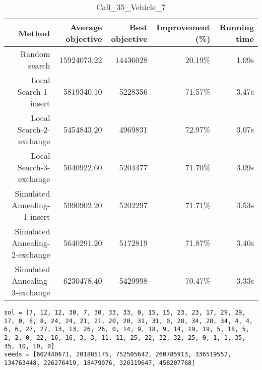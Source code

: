\begin{table}[ht]
\centering
\caption{Call\_35\_Vehicle\_7}
\label{tab:call35vehicle7}
\begin{tabular}{|r|r|r|r|r|}
Method & Average objective & Best objective & Improvement (\%) & Running time \\
\hline
Random search & 15924073.22 & 14436028 & 20.19\% & 1.09s\\
Local Search-1-insert & 5819340.10 & 5228356 & 71.57\% & 3.47s\\
Local Search-2-exchange & 5454843.20 & 4969831 & 72.97\% & 3.07s\\
Local Search-3-exchange & 5640922.60 & 5204477 & 71.70\% & 3.09s\\
Simulated Annealing-1-insert & 5990902.20 & 5202297 & 71.71\% & 3.53s\\
Simulated Annealing-2-exchange & 5640291.20 & 5172819 & 71.87\% & 3.40s\\
Simulated Annealing-3-exchange & 6230478.40 & 5429998 & 70.47\% & 3.33s\\
\end{tabular}%
\end{table}
\begin{lstlisting}[label={lst:call35vehicle7},caption=Optimal solution call\_35\_vehicle\_7]
sol = [7, 12, 12, 30, 7, 30, 33, 33, 0, 15, 15, 23, 23, 17, 29, 29, 17, 0, 8, 8, 24, 24, 21, 21, 20, 20, 31, 31, 0, 28, 34, 28, 34, 4, 4, 6, 6, 27, 27, 13, 13, 26, 26, 0, 14, 9, 18, 9, 14, 19, 19, 5, 18, 5, 2, 2, 0, 22, 16, 16, 3, 3, 11, 11, 25, 22, 32, 32, 25, 0, 1, 1, 35, 35, 10, 10, 0]
seeds = [602440671, 201885175, 752505642, 260785913, 336519552, 134763448, 226276419, 18479076, 326119647, 458207768]
\end{lstlisting}%
\clearpage


